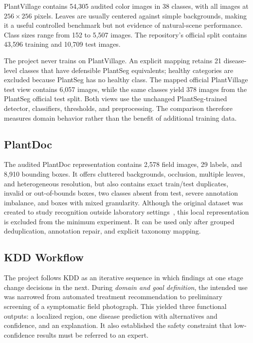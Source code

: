 \documentclass[conference]{IEEEtran}
\begin{document}
PlantVillage contains 54,305 audited color images in 38 classes, with all images at
$256\times256$ pixels. Leaves are usually centered against simple backgrounds, making it a useful
controlled benchmark but not evidence of natural-scene performance. Class sizes range from 152 to
5,507 images. The repository's official split contains 43,596 training and 10,709 test images.

The project never trains on PlantVillage. An explicit mapping retains 21 disease-level classes that
have defensible PlantSeg equivalents; healthy categories are excluded because PlantSeg has no
healthy class. The mapped official PlantVillage test view contains 6,057 images, while the same
classes yield 378 images from the PlantSeg official test split. Both views use the unchanged
PlantSeg-trained detector, classifiers, thresholds, and preprocessing. The comparison therefore
measures domain behavior rather than the benefit of additional training data.

\subsection{PlantDoc}

The audited PlantDoc representation contains 2,578 field images, 29 labels, and 8,910 bounding
boxes. It offers cluttered backgrounds, occlusion, multiple leaves, and heterogeneous resolution,
but also contains exact train/test duplicates, invalid or out-of-bounds boxes, two classes absent
from test, severe annotation imbalance, and boxes with mixed granularity. Although the original
dataset was created to study recognition outside laboratory settings~\cite{singh2020plantdoc}, this
local representation is excluded from the minimum experiment. It can be used only after grouped
deduplication, annotation repair, and explicit taxonomy mapping.

\subsection{KDD Workflow}

The project follows KDD as an iterative sequence in which findings at one stage change decisions in
the next. During \emph{domain and goal definition}, the intended use was narrowed from automated
treatment recommendation to preliminary screening of a symptomatic field photograph. This yielded
three functional outputs: a localized region, one disease prediction with alternatives and
confidence, and an explanation. It also established the safety constraint that low-confidence
results must be referred to an expert.
\end{document}
